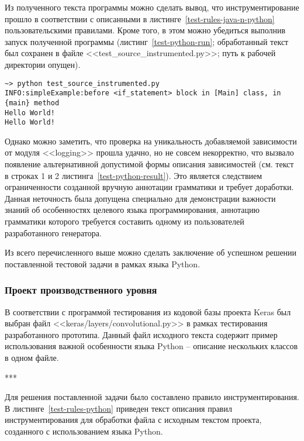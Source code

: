 Из полученного текста программы можно сделать вывод, что инструментирование прошло в соответствии с описанными в листинге~\ref{test-rules-java-n-python} пользовательскими правилами.
Кроме того, в этом можно убедиться выполнив запуск полученной программы (листинг~\ref{test-python-run}; обработанный текст был сохранен в файле <<test\_source\_instrumented.py>>; путь к рабочей директории опущен).

\begin{lstlisting}[frame=single, label={test-python-run}, caption={Результаты запуска обработанного тестового приложения.}]
~> python test_source_instrumented.py
INFO:simpleExample:before <if_statement> block in [Main] class, in {main} method
Hello World!
Hello World!
\end{lstlisting}

Однако можно заметить, что проверка на уникальность добавляемой зависимости от модуля <<logging>> прошла удачно, но не совсем некорректно, что вызвало появление альтернативной допустимой формы описания зависимостей (см. текст в строках 1 и 2 листинга~\ref{test-python-result}).
Это является следствием ограниченности созданной вручную аннотации грамматики и требует доработки.
Данная неточность была допущена специально для демонстрации важности знаний об особенностях целевого языка программирования, аннотацию грамматики которого требуется составить одному из пользователей разработанного генератора.

Из всего перечисленного выше можно сделать заключение об успешном решении поставленной тестовой задачи в рамках языка Python.

\subsubsection{Проект производственного уровня}

В соответствии с программой тестирования из кодовой базы проекта Keras был выбран файл <<keras/layers/convolutional.py>> в рамках тестирования разработанного прототипа.
Данный файл исходного текста содержит пример использования важной особенности языка Python -- описание нескольких классов в одном файле.

***

Для решения поставленной задачи было составлено правило инструментирования.
В листинге~\ref{test-rules-python} приведен текст описания правил инструментирования для обработки файла с исходным текстом проекта, созданного с использованием языка Python.

